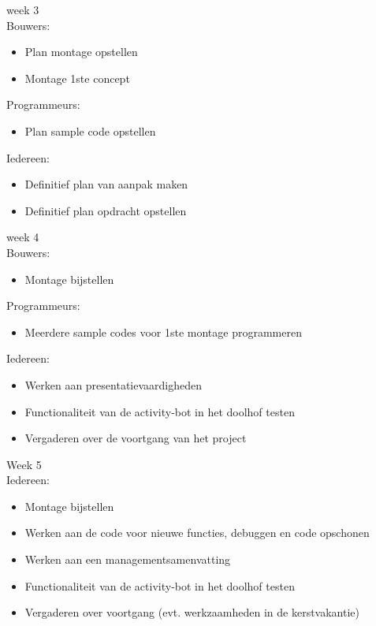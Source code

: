 \documentclass[oneside]{book}
\begin{document}
week 3\\
Bouwers: \\
\begin{itemize}
\item Plan montage opstellen
\item Montage 1ste concept
\end{itemize}

Programmeurs:\\
\begin{itemize}
\item Plan sample code opstellen
\end{itemize}

Iedereen:\\
\begin{itemize}
\item Definitief plan van aanpak maken
\item Definitief plan opdracht opstellen
\end{itemize}

week 4\\
Bouwers:\\
\begin{itemize}
\item Montage bijstellen
\end{itemize}

Programmeurs:\\
\begin{itemize}
\item Meerdere sample codes voor 1ste montage programmeren
\end{itemize}

Iedereen:\\
\begin{itemize}
\item Werken aan presentatievaardigheden
\item Functionaliteit van de activity-bot in het doolhof testen
\item Vergaderen over de voortgang van het project
\end{itemize}

Week 5\\
Iedereen:\\
\begin{itemize}
\item Montage bijstellen
\item Werken aan de code voor nieuwe functies, debuggen en code opschonen
\item Werken aan een managementsamenvatting
\item Functionaliteit van de activity-bot in het doolhof testen
\item Vergaderen over voortgang (evt. werkzaamheden in de kerstvakantie)
\end{itemize}
\end{document}
